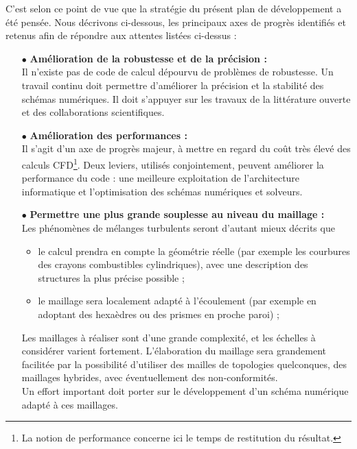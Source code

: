 C'est selon ce point de vue que la strat\'egie du pr\'esent plan de d\'eveloppement a \'et\'e pens\'ee. Nous d\'ecrivons ci-dessous, les principaux axes de progr\`es identifi\'es et retenus afin de r\'epondre aux attentes list\'ees ci-dessus : 

\begin{itemize}
\item[$\bullet$]
{\bf{Am\'elioration de la robustesse et de la pr\'ecision :}}\\
Il n'existe pas de code de calcul d\'epourvu de probl\`emes de robustesse. Un travail continu doit permettre d'am\'eliorer la pr\'ecision et la stabilit\'e des sch\'emas num\'eriques. Il doit s'appuyer sur les travaux de la litt\'erature ouverte et des collaborations scientifiques.\\
\item[$\bullet$]
{\bf{Am\'elioration des performances :}}\\
Il s'agit d'un axe de progr\`es majeur, \`a mettre en regard du coût tr\`es \'elev\'e des calculs CFD\footnote{La notion de performance concerne ici le temps de restitution du r\'esultat.}. Deux leviers, utilis\'es conjointement, peuvent am\'eliorer la performance du code : une meilleure exploitation de l'architecture informatique et l'optimisation des sch\'emas num\'eriques et solveurs.\\
\item[$\bullet$]
{\bf{Permettre une plus grande souplesse au niveau du maillage : }}\\
Les ph\'enom\`enes de m\'elanges turbulents seront d'autant mieux d\'ecrits que 
\begin{itemize}
\item
le calcul prendra en compte la g\'eom\'etrie r\'eelle (par exemple les courbures des crayons combustibles cylindriques), avec une description des structures  la plus pr\'ecise possible ;
\item
le maillage sera localement adapt\'e \`a l'\'ecoulement (par exemple en adoptant des hexa\`edres ou des prismes en proche paroi) ;
\end{itemize}
Les maillages \`a r\'ealiser sont d'une grande complexit\'e, et les \'echelles \`a consid\'erer varient fortement. L'\'elaboration du maillage sera grandement facilit\'ee par la possibilit\'e d'utiliser des mailles de topologies quelconques, des maillages hybrides, avec \'eventuellement des non-conformit\'es.\\
Un effort important doit porter sur le d\'eveloppement d'un sch\'ema num\'erique adapt\'e \`a ces maillages. \\

\end{itemize}
